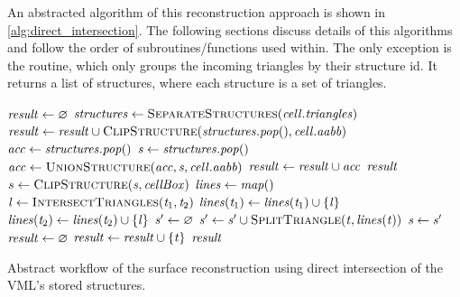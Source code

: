An abstracted algorithm of this reconstruction approach is shown in \cref{alg:direct_intersection}.
The following sections discuss details of this algorithms and follow the order of subroutines/functions used within.
The only exception is the  routine, which only groups the incoming triangles by their structure id.
It returns a list of structures, where each structure is a set of triangles.

\begin{algorithm}
	\centering
	\begin{algorithmic}[1]
			\State $\mathit{result} \gets \varnothing$
					\State $\var{structures} \gets \Call{SeparateStructures}{\var{cell}.\var{triangles}}$
						\State $\var{result} \gets \var{result} \cup \Call{ClipStructure}{\var{structures}.\var{pop}(), \var{cell}.\var{aabb}}$
						\State $\mathit{acc} \gets \mathit{structures}.\mathit{pop}()$
							\State $\mathit{s} \gets \mathit{structures}.\mathit{pop}()$
							\State $\var{acc} \gets \Call{UnionStructure}{\var{acc}, \var{s}, \var{cell}.\var{aabb}}$
						\EndWhile
						\State $\mathit{result} \gets \mathit{result} \cup \mathit{acc}$
					\EndIf
				\EndIf
			\EndFor
			\State \Return $\mathit{result}$
		\EndFunction
		\\
				\State $s \gets \Call{ClipStructure}{\var{s}, \var{cellBox}}$
			\EndFor
			\State $\mathit{lines} \gets \mathit{map}()$ 
				\State $\var{l} \gets \Call{IntersectTriangles}{\var{t}_1, \var{t}_2}$
				 
					\State $\mathit{lines}(\mathit{t}_1) \gets \mathit{lines}(\mathit{t}_1) \cup \{\mathit{l}\}$
					\State $\mathit{lines}(\mathit{t}_2) \gets \mathit{lines}(\mathit{t}_2) \cup \{\mathit{l}\}$
				\EndIf
			\EndFor
				\State $\mathit{s'} \gets \varnothing$
					\State $\var{s'} \gets \var{s'} \cup \Call{SplitTriangle}{\var{t}, \var{lines}(\var{t})}$
				\EndFor
				\State $\mathit{s} \gets \mathit{s'}$
			\EndFor
			\State $\mathit{result} \gets \varnothing$
						\State $\mathit{result} \gets \mathit{result} \cup \{\mathit{t}\}$
					\EndIf
				\EndFor
			\EndFor
			\State \Return $\mathit{result}$
		\EndFunction
	\end{algorithmic}
	\caption[Direct intersection workflow]{
		Abstract workflow of the surface reconstruction using direct intersection of the VML's stored structures.
	}
	\label{alg:direct_intersection}
\end{algorithm}


